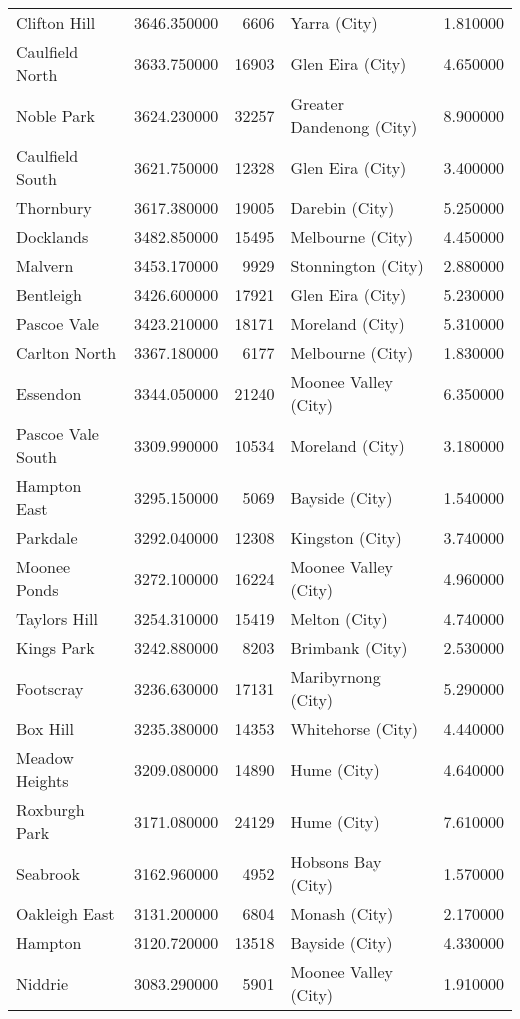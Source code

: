 \begin{longtable}{lrrlr}
Clifton Hill & 3646.350000 & 6606 & Yarra (City) & 1.810000 \\
Caulfield North & 3633.750000 & 16903 & Glen Eira (City) & 4.650000 \\
Noble Park & 3624.230000 & 32257 & Greater Dandenong (City) & 8.900000 \\
Caulfield South & 3621.750000 & 12328 & Glen Eira (City) & 3.400000 \\
Thornbury & 3617.380000 & 19005 & Darebin (City) & 5.250000 \\
Docklands & 3482.850000 & 15495 & Melbourne (City) & 4.450000 \\
Malvern & 3453.170000 & 9929 & Stonnington (City) & 2.880000 \\
Bentleigh & 3426.600000 & 17921 & Glen Eira (City) & 5.230000 \\
Pascoe Vale & 3423.210000 & 18171 & Moreland (City) & 5.310000 \\
Carlton North & 3367.180000 & 6177 & Melbourne (City) & 1.830000 \\
Essendon & 3344.050000 & 21240 & Moonee Valley (City) & 6.350000 \\
Pascoe Vale South & 3309.990000 & 10534 & Moreland (City) & 3.180000 \\
Hampton East & 3295.150000 & 5069 & Bayside (City) & 1.540000 \\
Parkdale & 3292.040000 & 12308 & Kingston (City) & 3.740000 \\
Moonee Ponds & 3272.100000 & 16224 & Moonee Valley (City) & 4.960000 \\
Taylors Hill & 3254.310000 & 15419 & Melton (City) & 4.740000 \\
Kings Park & 3242.880000 & 8203 & Brimbank (City) & 2.530000 \\
Footscray & 3236.630000 & 17131 & Maribyrnong (City) & 5.290000 \\
Box Hill & 3235.380000 & 14353 & Whitehorse (City) & 4.440000 \\
Meadow Heights & 3209.080000 & 14890 & Hume (City) & 4.640000 \\
Roxburgh Park & 3171.080000 & 24129 & Hume (City) & 7.610000 \\
Seabrook & 3162.960000 & 4952 & Hobsons Bay (City) & 1.570000 \\
Oakleigh East & 3131.200000 & 6804 & Monash (City) & 2.170000 \\
Hampton & 3120.720000 & 13518 & Bayside (City) & 4.330000 \\
Niddrie & 3083.290000 & 5901 & Moonee Valley (City) & 1.910000 \\

\end{longtable}

